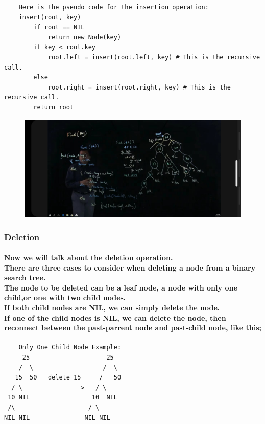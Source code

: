 \documentclass{article}
\begin{document}
\begin{verbatim}
    Here is the pseudo code for the insertion operation:
    insert(root, key)
        if root == NIL
            return new Node(key)
        if key < root.key
            root.left = insert(root.left, key) # This is the recursive call.
        else
            root.right = insert(root.right, key) # This is the recursive call.
        return root
\end{verbatim}

\begin{figure}[H]
    \includegraphics[width=\textwidth]{binarysearchtreeinsertion2.jpg}
\end{figure}

\subsubsection{Deletion}

\paragraph{
    Now we will talk about the deletion operation.\\
    There are three cases to consider when deleting a node from a binary search tree.\\
    The node to be deleted can be a leaf node, a node with only one child,or one with two child nodes.\\
    If both child nodes are NIL, we can simply delete the node.\\
    If one of the child nodes is NIL, we can delete the node, then reconnect between the past-parrent node and past-child node,
     like this;\\
}

\newpage

\begin{verbatim}
    Only One Child Node Example:
     25                     25
    /  \                   /  \
   15  50   delete 15     /   50
  / \       --------->   / \
 10 NIL                 10  NIL
 /\                    / \
NIL NIL               NIL NIL
\end{verbatim}
\end{document}

